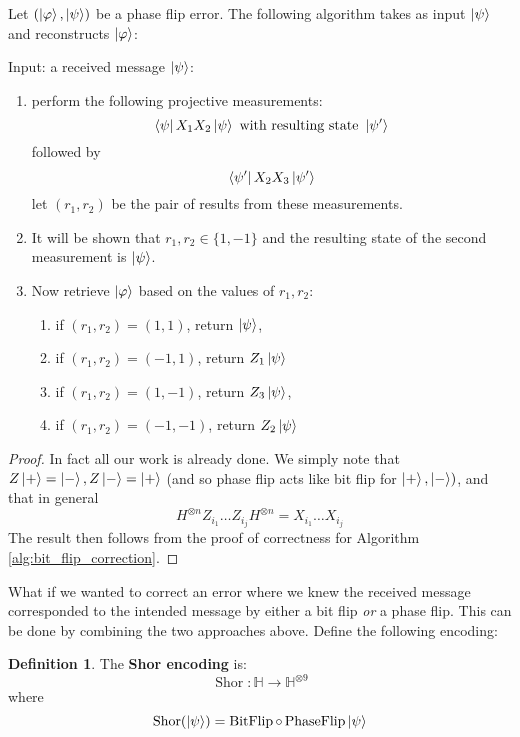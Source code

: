 \documentclass[12pt]{article}
\theoremstyle{plain}
\theoremstyle{definition}
\newtheorem{defn}[thm]{Definition} %
\newcommand{\bb}[1]{\mathbb{#1}}
\newcommand{\lto}{\longrightarrow}
\begin{document}
Let $(\ket{\varphi},\ket{\psi})$ be a phase flip error. The following algorithm takes as input $\ket{\psi}$ and reconstructs $\ket{\varphi}$:
\begin{algorithm}
	Input: a received message $\ket{\psi}$:
	\begin{enumerate}
		\item perform the following projective measurements:
		\begin{equation}
			\bra{\psi} X_1 X_2 \ket{\psi} \text{ with resulting state }\ket{\psi'}
		\end{equation}
		followed by
		\begin{equation}
			\bra{\psi'} X_2 X_3 \ket{\psi'}
		\end{equation}
		let $(r_1,r_2)$ be the pair of results from these measurements.
		\item It will be shown that $r_1, r_2 \in \lbrace 1, -1\rbrace$ and the resulting state of the second measurement is $\ket{\psi}$.
		\item Now retrieve $\ket{\varphi}$ based on the values of $r_1,r_2$:
		\begin{enumerate}
			\item if $(r_1,r_2) = (1,1)$, return $\ket{\psi}$,
			\item if $(r_1,r_2) = (-1,1)$, return $Z_1 \ket{\psi}$
			\item if $(r_1,r_2) = (1,-1)$, return $Z_3 \ket{\psi}$,
			\item if $(r_1,r_2) = (-1,-1)$, return $Z_2 \ket{\psi}$
		\end{enumerate}
	\end{enumerate}
\end{algorithm}
\begin{proof}
	In fact all our work is already done. We simply note that $Z\ket{+} = \ket{-}, Z\ket{-} = \ket{+}$ (and so phase flip acts like bit flip for $\ket{+},\ket{-})$, and that  in general
	\begin{equation}
		H^{\otimes n}Z_{i_1}\hdots Z_{i_j}H^{\otimes n} = X_{i_1}\hdots X_{i_j}
	\end{equation}
	The result then follows from the proof of correctness for Algorithm \ref{alg:bit_flip_correction}.
\end{proof}
What if we wanted to correct an error where we knew the received message corresponded to the intended message by either a bit flip \emph{or} a phase flip. This can be done by combining the two approaches above. Define the following encoding:
\begin{defn}
	The \textbf{Shor encoding} is:
	\begin{equation}
		\operatorname{Shor}: \bb{H} \lto \bb{H}^{\otimes 9}
	\end{equation}
	where
	\begin{equation}
		\operatorname{Shor}(\ket{\psi}) = \operatorname{BitFlip} \circ \operatorname{PhaseFlip}\ket{\psi}
	\end{equation}
\end{defn}
\end{document}
